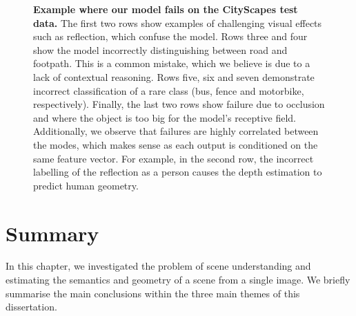 {\begin{figure}[t]
	\caption[Failure examples.]{\textbf{Example where our model fails on the CityScapes test data.} The first two rows show examples of challenging visual effects such as reflection, which confuse the model. Rows three and four show the model incorrectly distinguishing between road and footpath. This is a common mistake, which we believe is due to a lack of contextual reasoning. Rows five, six and seven demonstrate incorrect classification of a rare class (bus, fence and motorbike, respectively). Finally, the last two rows show failure due to occlusion and where the object is too big for the model's receptive field. Additionally, we observe that failures are highly correlated between the modes, which makes sense as each output is conditioned on the same feature vector. For example, in the second row, the incorrect labelling of the reflection as a person causes the depth estimation to predict human geometry.}
	\label{fig:fail}
\end{figure}
\clearpage%
}





















































\section{Summary}

In this chapter, we investigated the problem of scene understanding and estimating the semantics and geometry of a scene from a single image. We briefly summarise the main conclusions within the three main themes of this dissertation.

